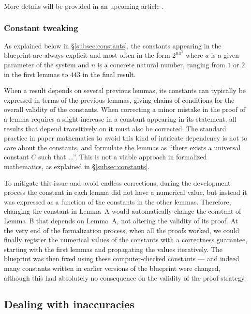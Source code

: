\documentclass[12pt, reqno]{amsart}
\theoremstyle{definition}
\theoremstyle{plain}
\begin{document}
More details will be provided in an upcoming article \cite{PortegiesRothgangRealInterpolation}.

\subsubsection{Constant tweaking}\label{subsubsec:const-tweak}
As explained below in
\S\ref{subsec:constants}, the constants appearing in the blueprint
are always explicit and most often in the form $2^{n a^3}$ where $a$ is a
given parameter of the system and $n$ is a concrete natural number, ranging
from $1$ or $2$ in the first lemmas to $443$ in the final result.

When a result depends on several previous lemmas, its constants can typically
be expressed in terms of the previous lemmas, giving chains of conditions for
the overall validity of the constants. When correcting a minor mistake in the
proof of a lemma requires a slight increase in a constant appearing in its statement, all results
that depend transitively on it must also be corrected. The standard practice
in paper mathematics to avoid this kind of intricate dependency is not to
care about the constants, and formulate the lemmas as ``there exists a
universal constant $C$ such that ...''. This is not a viable approach in
formalized mathematics, as explained in \S\ref{subsec:constants}.

To mitigate this issue and avoid endless corrections, during the development
process the constant in each lemma did not have a numerical value, but
instead it was expressed as a function of the constants in the other lemmas.
Therefore, changing the constant in Lemma~A would automatically change the
constant of Lemma~B that depends on Lemma~A, not altering the validity of its
proof. At the very end of the formalization process, when all the proofs
worked, we could finally register the numerical values of the constants with
a correctness guarantee, starting with the first lemmas and propagating the
values iteratively. The blueprint was then fixed using these computer-checked
constants --- and indeed many constants written in earlier versions of the
blueprint were changed, although this had absolutely no consequence on the validity of
the proof strategy.


\subsection{Dealing with inaccuracies}\label{subsec:blueprint_mistakes}
\end{document}
